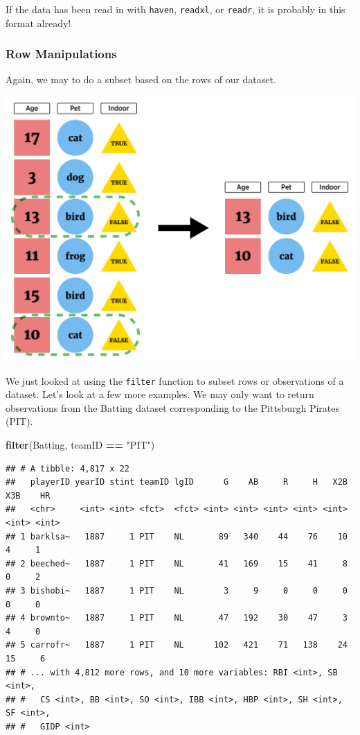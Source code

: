 \documentclass[
]{book}
\newenvironment{Shaded}{\begin{snugshade}}{\end{snugshade}}
\newcommand{\KeywordTok}[1]{\textcolor[rgb]{0.13,0.29,0.53}{\textbf{#1}}}
\newcommand{\NormalTok}[1]{#1}
\newcommand{\OperatorTok}[1]{\textcolor[rgb]{0.81,0.36,0.00}{\textbf{#1}}}
\newcommand{\StringTok}[1]{\textcolor[rgb]{0.31,0.60,0.02}{#1}}
\theoremstyle{definition}
\theoremstyle{definition}
\theoremstyle{definition}
\theoremstyle{remark}
\begin{document}
If the data has been read in with \texttt{haven}, \texttt{readxl}, or \texttt{readr}, it is probably in this format already!

\hypertarget{row-manipulations-1}{%
\subsubsection{Row Manipulations}\label{row-manipulations-1}}

Again, we may to do a subset based on the rows of our dataset.

\begin{center}\includegraphics[width=0.8\linewidth]{img/filterVisualF} \end{center}

We just looked at using the \texttt{filter} function to subset rows or observations of a dataset. Let's look at a few more examples. We may only want to return observations from the Batting dataset corresponding to the Pittsburgh Pirates (PIT).

\begin{Shaded}
\begin{Highlighting}[]
\KeywordTok{filter}\NormalTok{(Batting, teamID }\OperatorTok{==}\StringTok{ "PIT"}\NormalTok{)}
\end{Highlighting}
\end{Shaded}

\begin{verbatim}
## # A tibble: 4,817 x 22
##   playerID yearID stint teamID lgID      G    AB     R     H   X2B   X3B    HR
##   <chr>     <int> <int> <fct>  <fct> <int> <int> <int> <int> <int> <int> <int>
## 1 barklsa~   1887     1 PIT    NL       89   340    44    76    10     4     1
## 2 beeched~   1887     1 PIT    NL       41   169    15    41     8     0     2
## 3 bishobi~   1887     1 PIT    NL        3     9     0     0     0     0     0
## 4 brownto~   1887     1 PIT    NL       47   192    30    47     3     4     0
## 5 carrofr~   1887     1 PIT    NL      102   421    71   138    24    15     6
## # ... with 4,812 more rows, and 10 more variables: RBI <int>, SB <int>,
## #   CS <int>, BB <int>, SO <int>, IBB <int>, HBP <int>, SH <int>, SF <int>,
## #   GIDP <int>
\end{verbatim}
\end{document}

